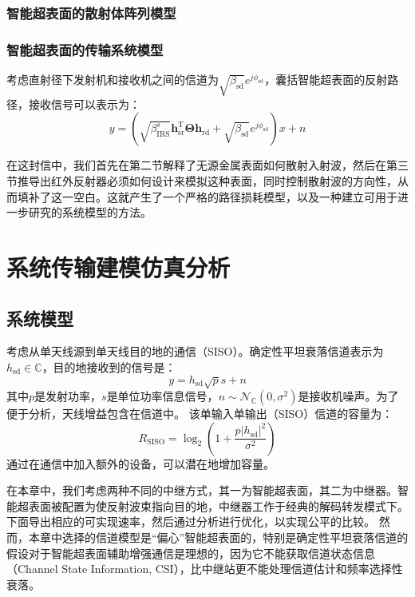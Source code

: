 \documentclass[supercite]{HustGraduPaper}
\begin{document}
\subsubsection{智能超表面的散射体阵列模型}

\subsubsection{智能超表面的传输系统模型}

考虑直射径下发射机和接收机之间的信道为$\sqrt{\beta_{\mathrm{sd}}} e^{j \phi_{\mathrm{sd}}}$，囊括智能超表面的反射路径，接收信号可以表示为：
\begin{equation}
	y=\left(\sqrt{\beta_{\mathrm{IRS}}^{s}} \mathbf{h}_{\mathrm{sr}}^{\mathrm{T}} \boldsymbol{\Theta} \mathbf{h}_{\mathrm{rd}}+\sqrt{\beta_{\mathrm{sd}}} e^{j \phi_{\mathrm{sd}}}\right) x+n
\end{equation}

在这封信中，我们首先在第二节解释了无源金属表面如何散射入射波，然后在第三节推导出红外反射器必须如何设计来模拟这种表面，同时控制散射波的方向性，从而填补了这一空白。这就产生了一个严格的路径损耗模型，以及一种建立可用于进一步研究的系统模型的方法。



\section{系统传输建模仿真分析}\label{sec:simulation}

\subsection{系统模型}

考虑从单天线源到单天线目的地的通信（SISO）。确定性平坦衰落信道表示为$h_{\mathrm{sd}} \in \mathbb{C}$，目的地接收到的信号是：
\begin{equation}
	y=h_{\mathrm{sd}} \sqrt{p} s+n
\end{equation}
其中$p$是发射功率，$s$是单位功率信息信号，$n \sim \mathcal{N}_{\mathbb{C}}\left(0, \sigma^{2}\right)$是接收机噪声。为了便于分析，天线增益包含在信道中。
该单输入单输出（SISO）信道的容量为：
\begin{equation}
	R_{\mathrm{SISO}}=\log _{2}\left(1+\frac{p\left|h_{\mathrm{sd}}\right|^{2}}{\sigma^{2}}\right)
\end{equation}
通过在通信中加入额外的设备，可以潜在地增加容量。

在本章中，我们考虑两种不同的中继方式，其一为智能超表面，其二为中继器。智能超表面被配置为使反射波束指向目的地，中继器工作于经典的解码转发模式下。
下面导出相应的可实现速率，然后通过分析进行优化，以实现公平的比较。
然而，本章中选择的信道模型是“偏心”智能超表面的，特别是确定性平坦衰落信道的假设对于智能超表面辅助增强通信是理想的，因为它不能获取信道状态信息（Channel State Information, CSI），比中继站更不能处理信道估计和频率选择性衰落。
\end{document}
